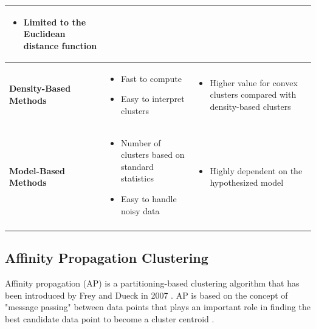 \documentclass[../UNBThesis2.tex]{subfiles}
\begin{document}
\begin{table}[!h]
\begin{tabularx}{\linewidth}{p{3cm} p{5.5cm} p{5.5cm}}
\begin{itemize}[*,nosep,leftmargin=0.2cm]
    \item Limited to the Euclidean distance function
\end{itemize}
\tabularnewline \hline
\vfill
 \textbf{Density-Based Methods}
& 
\begin{itemize}[*,nosep,leftmargin=0.2cm]
    \item Fast to compute
    \item Easy to interpret clusters %
\end{itemize}
 &       
\begin{itemize}[*,nosep,leftmargin=0.2cm]
    \item Higher value for convex clusters compared with density-based clusters
\end{itemize}
\tabularnewline \hline
\vfill
 \textbf{Model-Based Methods}
& 
\begin{itemize}[*,nosep,leftmargin=0.2cm]
    \item Number of clusters based on standard statistics 
    \item Easy to handle noisy data            
\end{itemize}
 &       
\begin{itemize}[*,nosep,leftmargin=0.2cm]
    \item Highly dependent on the hypothesized model
\end{itemize} 
\tabularnewline \hline
\vfill
\end{tabularx}
\end{table}



\subsection{Affinity Propagation Clustering}

Affinity propagation (AP) is a partitioning-based clustering algorithm that has been introduced by Frey and Dueck in 2007 \cite{frey2006mixture}. AP is based on the concept of "message passing" between data points that plays an important role in finding the best candidate data point to become a cluster centroid \cite{jiang2019exemplar, frey2007clustering}. 
\end{document}

